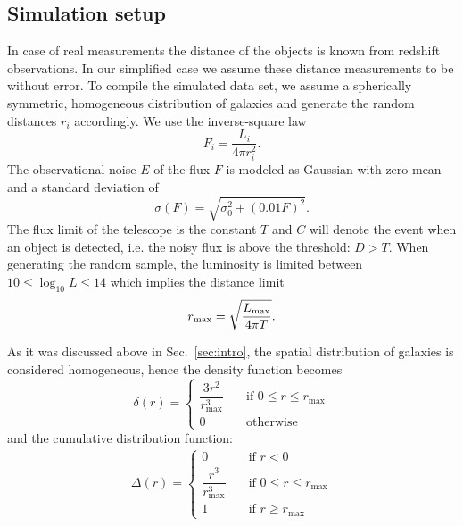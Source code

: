 \iffalse
\subsection{Simulation setup}
\label{sec:simsetup}




In case of real measurements the distance of the objects is known from redshift observations.
In our simplified case we assume these distance measurements to be without error.
To compile the simulated data set, we assume a spherically symmetric, homogeneous distribution of galaxies and generate the random distances $r_i$ accordingly.
We use the inverse-square law
\begin{equation}
F_i = \frac{L_i}{4 \pi r_i^2}.
\end{equation}
The observational noise $E$ of the flux $F$ is modeled as Gaussian with zero mean and a standard deviation of
\begin{equation}
\sigma(F)=\sqrt{\sigma_0^2+(0.01F)^2}.
\label{eq:error}
\end{equation}
The flux limit of the telescope is the constant $T$ and $C$ will denote the event when an object is detected, i.e. the noisy flux is above the threshold: $D > T$.
When generating the random sample, the luminosity is limited between $10 \leq \log_{10}{L} \leq 14$ which implies the distance limit
\begin{equation}
r_\textnormal{max} = \sqrt{\frac{L_\textnormal{max}}{4 \pi T}}.
\end{equation}

As it was discussed above in Sec.~\ref{sec:intro}, the spatial distribution of galaxies is considered homogeneous, hence the density function becomes \begin{equation}\label{eq:dist_dens_func}
\delta(r) = 
\begin{cases} 
    \dfrac{3r^{2}}{r_{\max}^{3}} & \quad \text{if } 0\leq r\leq r_{\max}\\
    0 & \quad \text{otherwise}
\end{cases} 
\end{equation}
and the cumulative distribution function: \begin{align}\label{eq:dist_cum_func} \Delta(r)= \begin{cases} 0 & \quad \text{if } r<0\\ \dfrac{r^{3}}{r_{\max}^{3}} & \quad \text{if } 0\leq r\leq r_{\max}\\ 1 & \quad \text{if } r\geq r_{\max} \end{cases} \end{align}


